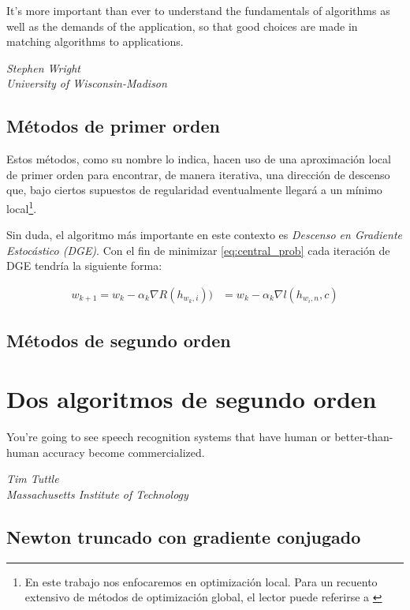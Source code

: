 \documentclass{book}
\theoremstyle{plain}
\theoremstyle{definition}
\theoremstyle{remark}
\begin{document}
\epigraph{It’s more important than ever to understand the fundamentals of
algorithms as well as the demands of the application, so that good
choices are made in matching algorithms to applications.}{\textit{Stephen Wright \\ University of Wisconsin-Madison}}
\newpage

\section{Métodos de primer orden}

Estos métodos, como su nombre lo indica, hacen uso de una aproximación local de primer orden para encontrar, de manera iterativa, una dirección de descenso que, bajo ciertos supuestos de regularidad \cite{NOCEDAL} eventualmente llegará a un mínimo local\footnote{En este trabajo nos enfocaremos en optimización local. Para un recuento extensivo de métodos de optimización global, el lector puede referirse a \cite{TORN}}.

Sin duda, el algoritmo más importante en este contexto es \emph{Descenso en Gradiente Estocástico (DGE)}\cite{ROBBINS}. Con el fin de minimizar \ref{eq:central_prob} cada iteración de DGE tendría la siguiente forma:

\begin{equation*}
\begin{split}
w_{k+1} = w_k - \alpha_k \nabla R(h_{w_k, i})) & = w_k - \alpha_k \nabla l(h_{w_i, n}, c)
\end{split}
\end{equation*}



\section{Métodos de segundo orden}


\chapter{Dos algoritmos de segundo orden}

\epigraph{You're going to see speech recognition systems that have human or better-than-human accuracy become commercialized.}{\textit{Tim Tuttle \\ Massachusetts Institute of Technology}}

\newpage

\section{Newton truncado con gradiente conjugado}
\end{document}
